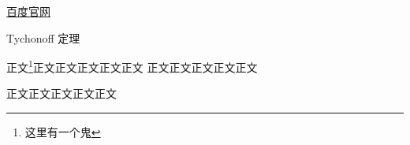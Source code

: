 
\href{http://www.baidu.com}{百度官网}




Tychonoff 定理 %

正文\footnote{这里有一个鬼}正文正文正文正文正文\cite{Cui1}
正文正文正文正文正文

正文正文正文正文正文